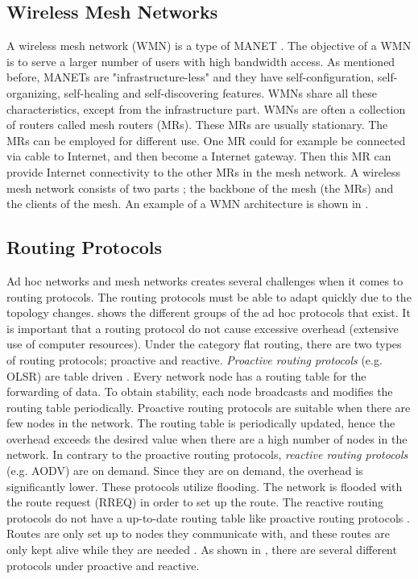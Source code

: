 \subsection{Wireless Mesh Networks}
\label{subsec:mesh}
A wireless mesh network (WMN) is a type of MANET \cite{wmn}. The objective of a WMN is to serve a larger number of users with high bandwidth access. As mentioned before, MANETs are "infrastructure-less" and they have self-configuration, self-organizing, self-healing and self-discovering features. WMNs share all these characteristics, except from the infrastructure part. WMNs are often a collection of routers called mesh routers (MRs). These MRs are usually stationary. The MRs can be employed for different use. One MR could for example be connected via cable to Internet, and then become a Internet gateway. Then this MR can provide Internet connectivity to the other MRs in the mesh network. A wireless mesh network consists of two parts \cite{wmn}; the backbone of the mesh (the MRs) and the clients of the mesh. An example of a WMN architecture is shown in . 


\subsection{Routing Protocols}
Ad hoc networks and mesh networks creates several challenges when it comes to routing protocols. The routing protocols must be able to adapt quickly due to the topology changes.  shows the different groups of the ad hoc protocols that exist. It is important that a routing protocol do not cause excessive overhead (extensive use of computer resources). Under the category flat routing, there are two types of routing protocols; proactive and reactive. \textit{Proactive routing protocols} (e.g. OLSR) are table driven \citep{proactivereactive}. Every network node has a routing table for the forwarding of data. To obtain stability, each node broadcasts and modifies the routing table periodically. Proactive routing protocols are suitable when there are few nodes in the network. The routing table is periodically updated, hence the overhead exceeds the desired value when there are a high number of nodes in the network. In contrary to the proactive routing protocols, \textit{reactive routing protocols} (e.g. AODV) are on demand. Since they are on demand, the overhead is significantly lower. These protocols utilize flooding. The network is flooded with the route request (RREQ) in order to set up the route. The reactive routing protocols do not have a up-to-date routing table like proactive routing protocols \cite{proactivereactive}. Routes are only set up to nodes they communicate with, and these routes are only kept alive while they are needed  \cite{adhoc2}. As shown in , there are several different protocols under proactive and reactive. 


